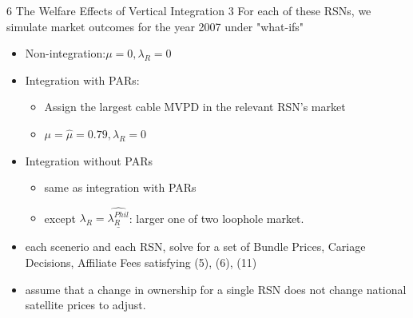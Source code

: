 \documentclass[10pt]{beamer}
\begin{document}
\begin{frame}{6 The Welfare Effects of Vertical Integration 3}
    For each of these RSNs, we simulate market outcomes for the year 2007 under "what-ifs"
    \begin{itemize}
        \item Non-integration:$\mu=0,\lambda_R=0$
        \item Integration with PARs: 
        \begin{itemize}
            \item Assign the largest cable MVPD in the relevant RSN's market
            \item $\mu=\hat{\mu}=0.79, \lambda_R=0$
        \end{itemize}
        \item Integration without PARs
        \begin{itemize}
            \item same as integration with PARs
            \item except $\lambda_R=\hat{\underline{\lambda_{R}^{Phil}}}$: larger one of two loophole market.
        \end{itemize}
        \item each scenerio and each RSN, solve for a set of Bundle Prices, Cariage Decisions, Affiliate Fees satisfying (5), (6), (11)
        \item assume that a change in ownership for a single RSN does not change national satellite prices to adjust.
    \end{itemize}
\end{frame}
\end{document}
